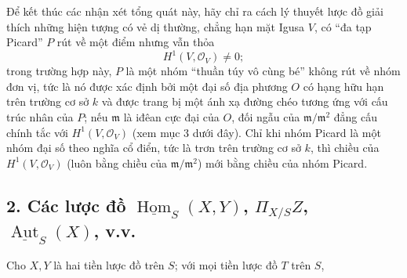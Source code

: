 Để kết thúc các nhận xét tổng quát này, hãy chỉ ra cách lý thuyết lược đồ giải
thích những hiện tượng có vẻ dị thường, chẳng hạn mặt Igusa $V$, có ``đa tạp
Picard'' $P$ rút về một điểm nhưng vẫn thỏa
\[
  H^1(V,\mathcal O_V)\ne 0 ;
\]
trong trường hợp này, $P$ là một nhóm ``thuần túy vô cùng bé'' không rút về
nhóm đơn vị, tức là nó được xác định bởi một đại số địa phương $O$ có hạng hữu
hạn trên trường cơ sở $k$ và được trang bị một ánh xạ đường chéo tương ứng với
cấu trúc nhân của $P$; nếu $\mathfrak m$ là iđêan cực đại của $O$, đối ngẫu của
$\mathfrak m/\mathfrak m^2$ đẳng cấu chính tắc với
$H^1(V,\mathcal O_V)$ (xem mục 3 dưới đây). Chỉ khi nhóm Picard là một nhóm
đại số theo nghĩa cổ điển, tức là trơn trên trường cơ sở $k$, thì chiều của
$H^1(V,\mathcal O_V)$ (luôn bằng chiều của $\mathfrak m/\mathfrak m^2$) mới
bằng chiều của nhóm Picard.

\subsection*{2. Các lược đồ $\underline{\operatorname{Hom}}_S(X,Y)$,
$\Pi_{X/S}Z$, $\underline{\operatorname{Aut}}_S(X)$, v.v.}

Cho $X,Y$ là hai tiền lược đồ trên $S$; với mọi tiền lược đồ $T$ trên $S$,

